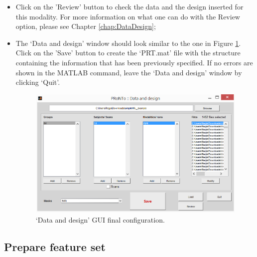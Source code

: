 \begin{itemize}
	\item Click on the 'Review' button to check the data and the design inserted for this modality. For more information on what one can do with the Review option, please see Chapter \ref{chap:DataDesign};
	
	\item The `Data and design' window should look similar to the one in Figure \ref{fig:dataDesignmkl}. Click on the 'Save' button to create the `PRT.mat' file with the structure containing the information that has been previously specified. If no errors are shown in the MATLAB command, leave the `Data and design' window by clicking `Quit'.
	

\begin{figure}[!h]
	\centering
		\includegraphics[scale=0.7]{images/Tutorial/mkl/dataDesignmkl.png}
	\caption{`Data and design' GUI final configuration.}
	\label{fig:dataDesignmkl}
\end{figure}	

\end{itemize}


\subsection{Prepare feature set}

